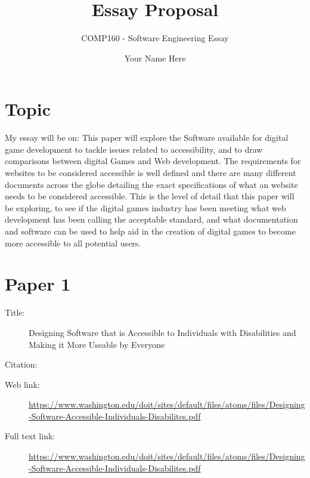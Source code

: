 \documentclass{scrartcl}
\title{Essay Proposal}
\subtitle{COMP160 - Software Engineering Essay}
\author{Your Name Here}
\begin{document}
\maketitle

\section*{Topic}

My essay will be on:
This paper will explore the Software available for digital game development to tackle issues related to accessibility, and to draw comparisons between digital Games and Web development. The requirements for websites to be considered accessible is well defined and there are many different documents across the globe detailing the exact specifications of what an website needs to be considered accessible. This is  the level of detail that this paper will be exploring, to see if the digital games industry has been meeting what web development has been calling the acceptable standard, and what documentation and software can be used to help aid in the creation of digital games to become more accessible to all potential users.

\section*{Paper 1}
\begin{description}
\item[Title:] Designing Software that is Accessible to Individuals with Disabilities and Making it More Useable by Everyone
\item[Citation:] \cite{Sheryl Burgstahler}
\item[Web link:] \url{https://www.washington.edu/doit/sites/default/files/atoms/files/Designing-Software-Accessible-Individuals-Disabilites.pdf}
\item[Full text link:] \url{https://www.washington.edu/doit/sites/default/files/atoms/files/Designing-Software-Accessible-Individuals-Disabilites.pdf}
\end{description}
\end{document}
